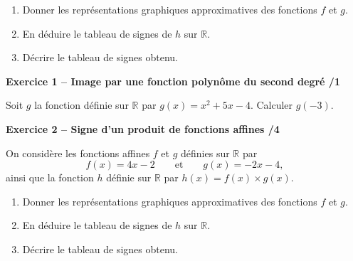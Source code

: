 \documentclass[10pt,a4paper]{article}
\begin{document}
\begin{enumerate}
\item Donner les représentations graphiques approximatives des fonctions \(f\) et \(g\).

\vspace{2cm}

\item En déduire le tableau de signes de \(h\) sur \(\mathbb{R}\).

\vspace{4cm}

\item Décrire le tableau de signes obtenu.
\end{enumerate}

\newpage



\textbf{Exercice 1 -- Image par une fonction polynôme du second degré \hfill /1}

Soit \(g\) la fonction définie sur \(\mathbb{R}\) par \(g(x)=x^2+5x-4\). Calculer \(g(-3)\).

\vspace{2cm}

\textbf{Exercice 2 -- Signe d'un produit de fonctions affines \hfill /4}

On considère les fonctions affines \(f\) et \(g\) définies sur \(\mathbb{R}\) par
\[
f(x)=4x-2 \qquad\text{et}\qquad g(x)=-2x-4,
\]
ainsi que la fonction \(h\) définie sur \(\mathbb{R}\) par \(h(x)=f(x)\times g(x)\).

\begin{enumerate}
\item Donner les représentations graphiques approximatives des fonctions \(f\) et \(g\).

\vspace{2cm}

\item En déduire le tableau de signes de \(h\) sur \(\mathbb{R}\).

\vspace{4cm}

\item Décrire le tableau de signes obtenu.
\end{enumerate}

\newpage

\end{document}
